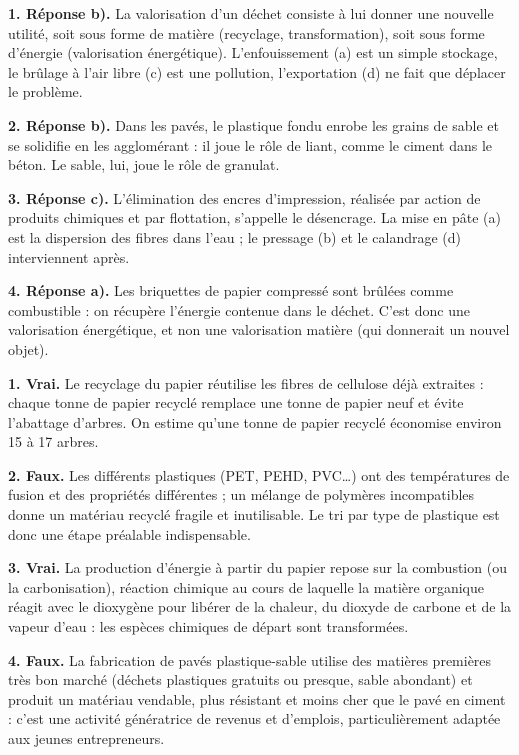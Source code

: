 \documentclass[11pt]{article}
\newcommand{\cle}[1]{{\popxbold\color{popdark}#1}}
\begin{document}
\begin{corrige}
\textbf{1. Réponse b).} La valorisation d'un déchet consiste à lui donner une \cle{nouvelle utilité}, soit sous forme de \cle{matière} (recyclage, transformation), soit sous forme d'\cle{énergie} (valorisation énergétique). L'enfouissement (a) est un simple stockage, le brûlage à l'air libre (c) est une pollution, l'exportation (d) ne fait que déplacer le problème.

\textbf{2. Réponse b).} Dans les pavés, le plastique fondu enrobe les grains de sable et se solidifie en les agglomérant : il joue le rôle de \cle{liant}, comme le ciment dans le béton. Le sable, lui, joue le rôle de \cle{granulat}.

\textbf{3. Réponse c).} L'élimination des encres d'impression, réalisée par action de produits chimiques et par flottation, s'appelle le \cle{désencrage}. La mise en pâte (a) est la dispersion des fibres dans l'eau ; le pressage (b) et le calandrage (d) interviennent après.

\textbf{4. Réponse a).} Les briquettes de papier compressé sont brûlées comme combustible : on récupère l'\cle{énergie} contenue dans le déchet. C'est donc une \cle{valorisation énergétique}, et non une valorisation matière (qui donnerait un nouvel objet).
\end{corrige}

\begin{corrige}
\textbf{1. Vrai.} Le recyclage du papier réutilise les fibres de cellulose déjà extraites : chaque tonne de papier recyclé remplace une tonne de papier neuf et évite l'abattage d'arbres. On estime qu'une tonne de papier recyclé économise environ 15 à 17 arbres.

\textbf{2. Faux.} Les différents plastiques (PET, PEHD, PVC\ldots) ont des températures de fusion et des propriétés différentes ; un mélange de polymères incompatibles donne un matériau recyclé fragile et inutilisable. Le \cle{tri par type de plastique} est donc une étape préalable indispensable.

\textbf{3. Vrai.} La production d'énergie à partir du papier repose sur la \cle{combustion} (ou la carbonisation), réaction chimique au cours de laquelle la matière organique réagit avec le dioxygène pour libérer de la chaleur, du dioxyde de carbone et de la vapeur d'eau : les espèces chimiques de départ sont transformées.

\textbf{4. Faux.} La fabrication de pavés plastique-sable utilise des matières premières très bon marché (déchets plastiques gratuits ou presque, sable abondant) et produit un matériau vendable, plus résistant et moins cher que le pavé en ciment : c'est une activité génératrice de revenus et d'emplois, particulièrement adaptée aux jeunes entrepreneurs.
\end{corrige}
\end{document}
